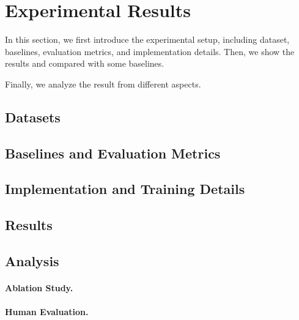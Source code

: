 \section{Experimental Results}

In this section, we first introduce the experimental setup, including dataset, baselines, evaluation metrics, and implementation details. Then, we show the results and compared with some baselines.

Finally, we analyze the result from different aspects.

\subsection{Datasets}



\subsection{Baselines and Evaluation Metrics}



\subsection{Implementation and Training Details} \label{sec:exset}



\subsection{Results} \label{sec:result}



\subsection{Analysis} \label{sec:analysis}



\paragraph{Ablation Study. }


\paragraph{Human Evaluation.}
